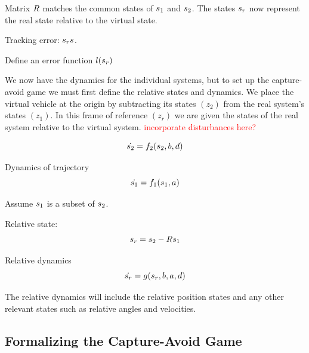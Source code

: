 Matrix $R$ matches the common states of $s_1$ and $s_2$. The states $s_r$ now represent the real state relative to the virtual state.



Tracking error: $s_r {s}$.

Define an error function $l(s_r)$

We now have the dynamics for the individual systems, but to set up the capture-avoid game we must first define the relative states and dynamics. We place the virtual vehicle at the origin by subtracting its states $(z_2)$ from the real system's states $(z_1)$. In this frame of reference $(z_r)$ we are given the states of the real system relative to the virtual system. \textcolor{red}{incorporate disturbances here?}


\begin{equation}
\dot{s_2} = f_2(s_2, b, d)
\end{equation}

Dynamics of trajectory
\begin{equation}
\dot{s_1} = f_1(s_1, a)
\end{equation}

Assume $s_1$ is a subset of $s_2$. 

Relative state:
\begin{equation}
s_r = s_2 - Rs_1
\end{equation}

Relative dynamics
\begin{equation}
\dot{s_r} = g(s_r, b, a, d)
\end{equation}

The relative dynamics will include the relative position states and any other relevant states such as relative angles and velocities.

\subsection{Formalizing the Capture-Avoid Game}

